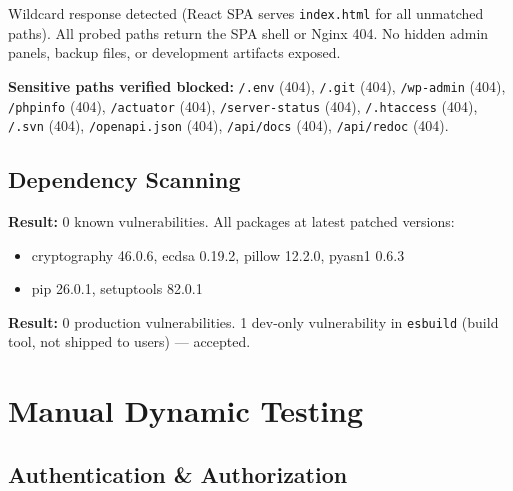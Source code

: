 \documentclass[11pt,a4paper]{article}
\begin{document}
\begin{tcolorbox}[colback=pass!5, colframe=pass, title=\textbf{Directory Enumeration --- PASS}]
Wildcard response detected (React SPA serves \texttt{index.html} for all unmatched paths). All probed paths return the SPA shell or Nginx 404. No hidden admin panels, backup files, or development artifacts exposed.

\textbf{Sensitive paths verified blocked:}
\texttt{/.env} (404), \texttt{/.git} (404), \texttt{/wp-admin} (404), \texttt{/phpinfo} (404), \texttt{/actuator} (404), \texttt{/server-status} (404), \texttt{/.htaccess} (404), \texttt{/.svn} (404), \texttt{/openapi.json} (404), \texttt{/api/docs} (404), \texttt{/api/redoc} (404).
\end{tcolorbox}

\subsection{Dependency Scanning}

\begin{tcolorbox}[colback=pass!5, colframe=pass, title=\textbf{pip-audit (Python) --- PASS}]
\textbf{Result:} 0 known vulnerabilities. All packages at latest patched versions:
\begin{itemize}[nosep]
  \item cryptography 46.0.6, ecdsa 0.19.2, pillow 12.2.0, pyasn1 0.6.3
  \item pip 26.0.1, setuptools 82.0.1
\end{itemize}
\end{tcolorbox}

\begin{tcolorbox}[colback=pass!5, colframe=pass, title=\textbf{npm audit (JavaScript) --- PASS}]
\textbf{Result:} 0 production vulnerabilities. 1 dev-only vulnerability in \texttt{esbuild} (build tool, not shipped to users) --- accepted.
\end{tcolorbox}

\newpage
\section{Manual Dynamic Testing}

\subsection{Authentication \& Authorization}
\end{document}
